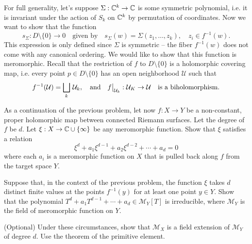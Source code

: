 \documentclass{lkx_pset}
\begin{document}
\begin{solution}
  For full generality, let's suppose $\Sigma : \mathbb{C}^k \to \mathbb{C}$ is some symmetric polynomial, i.e. it is invariant under the action of $S_k$ on $\mathbb{C}^k$ by permutation of coordinates. Now we want to show that the function
  \[
    s_\Sigma : D\setminus \{0\} \to 0\quad\textrm{given by}\quad s_\Sigma(w) = \Sigma(z_1,\ldots, z_k), \quad z_i\in f^{-1}(w).
  \]
  This expression is only defined since $\Sigma$ is symmetric -- the fiber $f^{-1}(w)$ does not come with any canonical ordering. We would like to show that this function is meromorphic. Recall that the restriction of $f$ to $D\setminus \{0\}$ is a holomorphic covering map, i.e. every point $p\in D\setminus \{0\}$ has an open neighborhood $\mathcal{U}$ such that
  \[
    f^{-1}(\mathcal{U}) = \bigsqcup_{k}\, \mathcal{U}_k, \quad \textrm{and}\quad \restr{f}{\mathcal{U}_k} : \mathcal{U}_K \to \mathcal{U}\quad\textrm{is a biholomorphism.}
  \]

\end{solution}

\begin{problem}{3}
  As a continuation of the previous problem, let now $f : X \to Y$ be a non-constant, proper holomorphic map between connected Riemann surfaces. Let the degree of $f$ be $d$. Let $\xi : X \to \mathbb{C} \cup \{\infty\}$ be any meromorphic function. Show that $\xi$ satisfies a relation
  \[
    \xi^d + a_1\xi^{d-1} + a_2\xi^{d-2}+\cdots+a_d = 0
  \]
  where each $a_i$ is a meromorphic function on $X$ that is pulled back along $f$ from the target space $Y$.
\end{problem}

\begin{problem}{4}
  Suppose that, in the context of the previous problem, the function $\xi$ takes $d$ distinct finite values at the points $f^{-1}(y)$ for at least one point $y\in Y$. Show that the polynomial $T^d + a_1 T^{d-1}+\cdots +a_d\in \mathcal{M}_Y[T]$ is irreducible, where $\mathcal{M}_Y$ is the field of meromorphic function on $Y$.
\end{problem}

\begin{solution}
  \begin{part}{(Optional)}
    Under these circumstances, show that $\mathcal{M}_X$ is a field extension of $\mathcal{M}_Y$ of degree $d$. Use the theorem of the primitive element.
  \end{part}
\end{solution}
\end{document}
